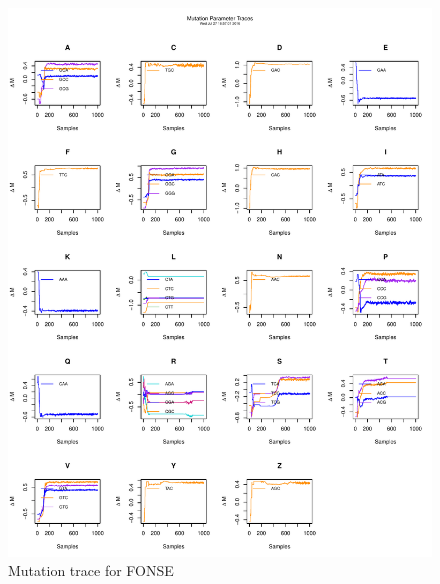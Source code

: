 \documentclass[11pt]{labbook}
\begin{document}
    \begin{figure}
        \centering
        \includegraphics[scale=.65]{FONSE_Plots/2016/July_27/MutationTrace}
        \caption{Mutation trace for FONSE}
        \label{fig:JULY27_MUT}
    \end{figure}
\end{document}

